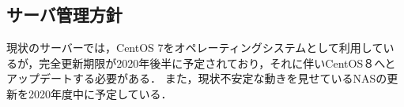 \subsection*{サーバ管理方針}

現状のサーバーでは，CentOS 7をオペレーティングシステムとして利用しているが，完全更新期限が2020年後半に予定されており，それに伴いCentOS８へとアップデートする必要がある．
また，現状不安定な動きを見せているNASの更新を2020年度中に予定している．